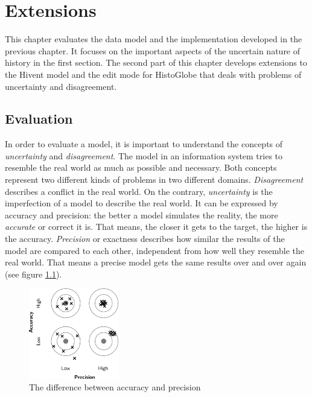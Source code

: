 
\chapter{Extensions} %
\label{cha:extensions}

This chapter evaluates the data model and the implementation developed in the previous chapter. It focuses on the important aspects of the uncertain nature of history in the first section. The second part of this chapter develops extensions to the Hivent model and the edit mode for HistoGlobe that deals with problems of uncertainty and disagreement.

\section{Evaluation} %
\label{sec:evaluation}

In order to evaluate a model, it is important to understand the concepts of \emph{uncertainty} and \emph{disagreement}. The model in an information system tries to resemble the real world as much as possible and necessary. Both concepts represent two different kinds of problems in two different domains.
\emph{Disagreement} describes a conflict in the real world. On the contrary, \emph{uncertainty} is the imperfection of a model to describe the real world. It can be expressed by accuracy and precision: the better a model simulates the reality, the more \emph{accurate} or correct it is. That means, the closer it gets to the target, the higher is the accuracy. \emph{Precision} or exactness describes how similar the results of the model are compared to each other, independent from how well they resemble the real world. That means a precise model gets the same results over and over again (see figure \ref{fig:accuracy_precision}).

\begin{figure}[ht]
  \vspace{1em}
  \centering
  \includegraphics[width = 0.35\textwidth]{graphics/extensions/accuracy_precision}
  \caption{The difference between accuracy and precision}
  \label{fig:accuracy_precision}
\end{figure}


